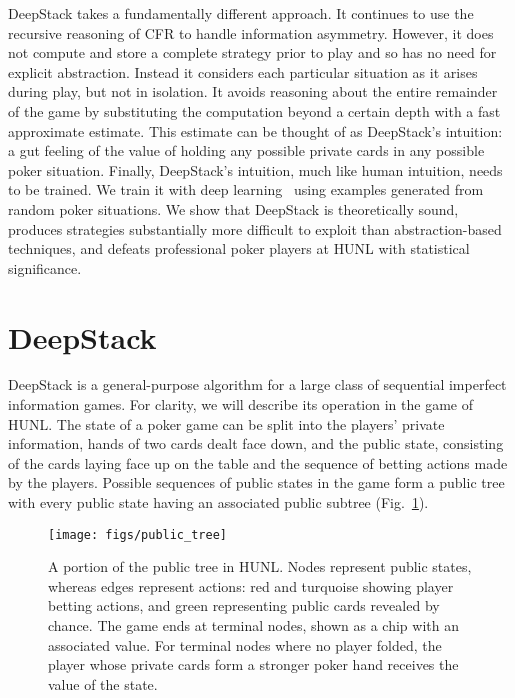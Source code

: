 \documentclass[12pt]{article}
\newif\iffinal
\newcommand{\HUNL}{{HUNL}}
\begin{document}
DeepStack takes a fundamentally different approach.  It continues to use the recursive reasoning of CFR to handle information asymmetry.  However, it does not compute and store a complete strategy prior to play and so has no need for explicit abstraction.  Instead it considers each particular situation as it arises during play, but not in isolation.  It avoids reasoning about the entire remainder of the game by substituting the computation beyond a certain depth with a fast approximate estimate.  This estimate can be thought of as DeepStack's intuition: a gut feeling of the value of holding any possible private cards in any possible poker situation.  Finally, DeepStack's intuition, much like human intuition, needs to be trained.  We train it with deep learning~\cite{deep-learning-in-poker} using examples generated from random poker situations.  We show that DeepStack is theoretically sound, produces strategies substantially more difficult to exploit than abstraction-based techniques, and defeats professional poker players at \HUNL{} with statistical significance. 

\section*{DeepStack}

DeepStack is a general-purpose algorithm for a large class of sequential imperfect information games.  For clarity, we will describe its operation in the game of \HUNL.  The state of a poker game
can be split into the players' private information, hands of two cards dealt face down,
and the public state,
consisting of the cards laying face up on the table and the sequence
of betting actions made by the players. Possible sequences of public states in
the game form a public tree with every public state having an associated public subtree (Fig.~\ref{fig:public_tree}).

\iffinal\else 
\begin{figure}[t]
\centering
\texttt{[image: figs/public\_tree]}
\caption{A portion of the public tree in \HUNL{}.  Nodes represent public states, whereas edges represent actions: red and turquoise showing player betting actions, and green representing public cards revealed by chance.  The game ends at terminal nodes, shown as a chip with an associated value.  For terminal nodes where no player folded, the player whose private cards form a stronger poker hand receives the value of the state.}\label{fig:public_tree}
\end{figure}
\fi
\end{document}
